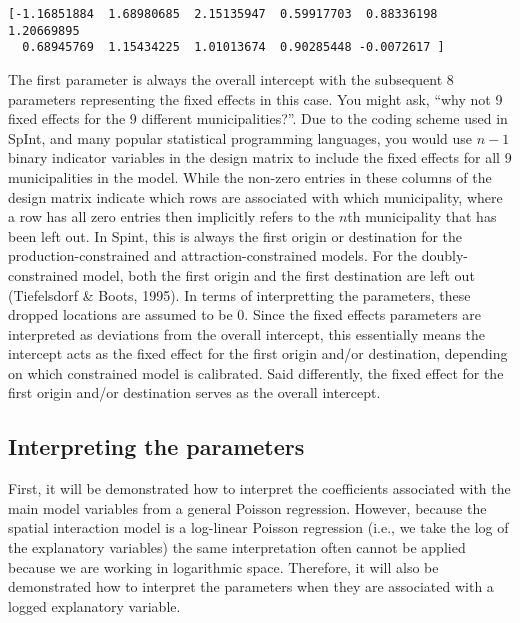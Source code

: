 \documentclass[11pt]{article}
\begin{document}
    \begin{Verbatim}[commandchars=\\\{\}]
[-1.16851884  1.68980685  2.15135947  0.59917703  0.88336198  1.20669895
  0.68945769  1.15434225  1.01013674  0.90285448 -0.0072617 ]

    \end{Verbatim}

    The first parameter is always the overall intercept with the subsequent
8 parameters representing the fixed effects in this case. You might ask,
``why not 9 fixed effects for the 9 different municipalities?''. Due to
the coding scheme used in SpInt, and many popular statistical
programming languages, you would use \(n - 1\) binary indicator
variables in the design matrix to include the fixed effects for all 9
municipalities in the model. While the non-zero entries in these columns
of the design matrix indicate which rows are associated with which
municipality, where a row has all zero entries then implicitly refers
to the \(n\)th municipality that has been left out. In Spint, this is
always the first origin or destination for the production-constrained
and attraction-constrained models. For the doubly-constrained model,
both the first origin and the first destination are left out
(Tiefelsdorf \& Boots, 1995). In terms of interpretting the parameters,
these dropped locations are assumed to be 0. Since the fixed effects
parameters are interpreted as deviations from the overall intercept,
this essentially means the intercept acts as the fixed effect for the
first origin and/or destination, depending on which constrained model is
calibrated. Said differently, the fixed effect for the first origin
and/or destination serves as the overall intercept.

    \subsection{Interpreting the
parameters}\label{interpretting-the-parameters}

    First, it will be demonstrated how to interpret the coefficients
associated with the main model variables from a general Poisson
regression. However, because the spatial interaction model is a
log-linear Poisson regression (i.e., we take the log of the explanatory
variables) the same interpretation often cannot be applied because we are
working in logarithmic space. Therefore, it will also be demonstrated
how to interpret the parameters when they are associated with a logged
explanatory variable.
\end{document}
